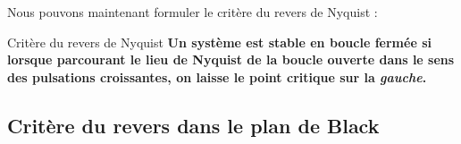 Nous pouvons maintenant formuler le critère du revers de Nyquist :

\begin{criteria}{Critère du revers de Nyquist}
\textbf{Un système est stable en boucle fermée si lorsque parcourant 
        le lieu de Nyquist de la boucle ouverte dans le sens des 
        pulsations croissantes, on laisse le point critique sur la \emph{gauche}.}
\end{criteria}

\newpage
\subsection{Critère du revers dans le plan de Black}

\acpl

